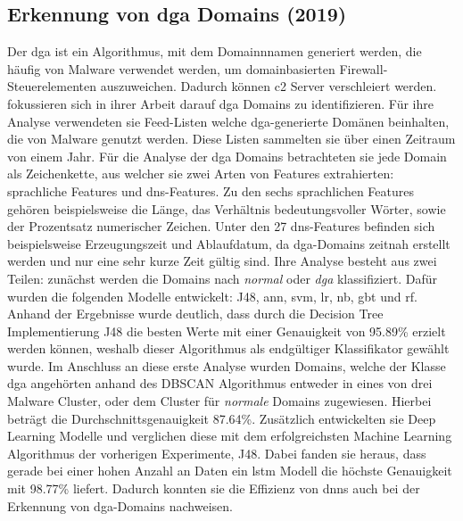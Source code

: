 \documentclass[
    12pt, %
    DIV10,
    ngerman, %
    a4paper, %
    oneside, %
    titlepage, %
    parskip=half, %
    headings=normal, %
    listof=totoc, %
    bibliography=totoc, %
    index=totoc, %
    captions=tableheading, %
    final %
]{scrreprt}
\begin{document}
\subsection{Erkennung von \acs{dga} Domains (2019)}
Der \ac{dga} ist ein Algorithmus, mit dem Domainnnamen generiert werden, die häufig von Malware verwendet werden, um domainbasierten Firewall-Steuerelementen auszuweichen. Dadurch können \ac{c2} Server verschleiert werden.\\
\textcite{Li2019} fokussieren sich in ihrer Arbeit darauf \ac{dga} Domains zu identifizieren. Für ihre Analyse verwendeten sie Feed-Listen \parencite{Bam} welche \ac{dga}-generierte Domänen beinhalten, die von Malware genutzt werden. Diese Listen sammelten sie über einen Zeitraum von einem Jahr. Für die Analyse der \ac{dga} Domains betrachteten sie jede Domain als Zeichenkette, aus welcher sie zwei Arten von Features extrahierten: sprachliche Features und \ac{dns}-Features. Zu den sechs sprachlichen Features gehören beispielsweise die Länge, das Verhältnis bedeutungsvoller Wörter, sowie der Prozentsatz numerischer Zeichen. Unter den 27 \ac{dns}-Features befinden sich beispielsweise Erzeugungszeit und Ablaufdatum, da \ac{dga}-Domains zeitnah erstellt werden und nur eine sehr kurze Zeit gültig sind. Ihre Analyse besteht aus zwei Teilen: zunächst werden die Domains nach \emph{normal} oder \emph{\ac{dga}} klassifiziert. Dafür wurden die folgenden Modelle entwickelt: J48, \ac{ann}, \ac{svm}, \ac{lr}, \ac{nb}, \ac{gbt} und \ac{rf}. Anhand der Ergebnisse wurde deutlich, dass durch die Decision Tree Implementierung J48 die besten Werte mit einer Genauigkeit von 95.89\% erzielt werden können, weshalb dieser Algorithmus als endgültiger Klassifikator gewählt wurde.
Im Anschluss an diese erste Analyse wurden Domains, welche der Klasse \ac{dga} angehörten anhand des DBSCAN Algorithmus entweder in eines von drei Malware Cluster, oder dem Cluster für \emph{normale} Domains zugewiesen. Hierbei beträgt die Durchschnittsgenauigkeit 87.64\%. Zusätzlich entwickelten sie Deep Learning Modelle und verglichen diese mit dem erfolgreichsten Machine Learning Algorithmus der vorherigen Experimente, J48. Dabei fanden sie heraus, dass gerade bei einer hohen Anzahl an Daten ein \ac{lstm} Modell die höchste Genauigkeit mit 98.77\% liefert. Dadurch konnten sie die Effizienz von \ac{dnns} auch bei der Erkennung von \ac{dga}-Domains nachweisen.
%
\end{document}
